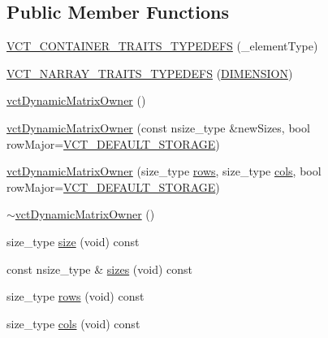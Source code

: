 \subsection*{Public Member Functions}
\begin{DoxyCompactItemize}
\item 
\hyperlink{classvct_dynamic_matrix_owner_a11538431d608a6ba8d1431547fb77b1d}{V\+C\+T\+\_\+\+C\+O\+N\+T\+A\+I\+N\+E\+R\+\_\+\+T\+R\+A\+I\+T\+S\+\_\+\+T\+Y\+P\+E\+D\+E\+F\+S} (\+\_\+element\+Type)
\item 
\hyperlink{classvct_dynamic_matrix_owner_a226011482d7ac8a28db6c06b08e3ee50}{V\+C\+T\+\_\+\+N\+A\+R\+R\+A\+Y\+\_\+\+T\+R\+A\+I\+T\+S\+\_\+\+T\+Y\+P\+E\+D\+E\+F\+S} (\hyperlink{classvct_dynamic_matrix_owner_ab539c6209377e71938f3be5a0f73aa90a3cbd1d8cbd91b8e603c01551869fb839}{D\+I\+M\+E\+N\+S\+I\+O\+N})
\item 
\hyperlink{classvct_dynamic_matrix_owner_a760d3b528cdf268fa0d6ce118396b5d8}{vct\+Dynamic\+Matrix\+Owner} ()
\item 
\hyperlink{classvct_dynamic_matrix_owner_a7bd36798c8b00b5dd7f1f2c05c15fc43}{vct\+Dynamic\+Matrix\+Owner} (const nsize\+\_\+type \&new\+Sizes, bool row\+Major=\hyperlink{vct_forward_declarations_8h_aacdb3b0140beef8a3c2025b808b74a73}{V\+C\+T\+\_\+\+D\+E\+F\+A\+U\+L\+T\+\_\+\+S\+T\+O\+R\+A\+G\+E})
\item 
\hyperlink{classvct_dynamic_matrix_owner_a7b008ac9387bc143138c8c70ef99bda1}{vct\+Dynamic\+Matrix\+Owner} (size\+\_\+type \hyperlink{classvct_dynamic_matrix_owner_acbdac2c17cafa939c90536ab43a83ae6}{rows}, size\+\_\+type \hyperlink{classvct_dynamic_matrix_owner_a39b183ecd47dcfb5ca6957e390e39c4a}{cols}, bool row\+Major=\hyperlink{vct_forward_declarations_8h_aacdb3b0140beef8a3c2025b808b74a73}{V\+C\+T\+\_\+\+D\+E\+F\+A\+U\+L\+T\+\_\+\+S\+T\+O\+R\+A\+G\+E})
\item 
\hyperlink{classvct_dynamic_matrix_owner_a38e7fafdc1f6bde17bde0ba888f45faf}{$\sim$vct\+Dynamic\+Matrix\+Owner} ()
\item 
size\+\_\+type \hyperlink{classvct_dynamic_matrix_owner_ad39f338c34ca4aa991e0919ffda110a3}{size} (void) const 
\item 
const nsize\+\_\+type \& \hyperlink{classvct_dynamic_matrix_owner_ad1f9518f9d47c15b6b405453efe4631c}{sizes} (void) const 
\item 
size\+\_\+type \hyperlink{classvct_dynamic_matrix_owner_acbdac2c17cafa939c90536ab43a83ae6}{rows} (void) const 
\item 
size\+\_\+type \hyperlink{classvct_dynamic_matrix_owner_a39b183ecd47dcfb5ca6957e390e39c4a}{cols} (void) const 

\end{DoxyCompactItemize}
